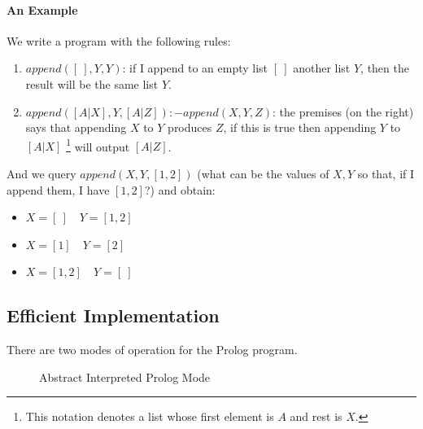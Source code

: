 \documentclass[10pt,a4paper]{article}
\begin{document}
\paragraph{An Example}
We write a program with the following rules:
\begin{enumerate}
\item $append([\ ],Y,Y)$: if I append to an empty list $[\ ]$ another list $Y$, then the result will be the same list $Y$.
\item $append([A|X],Y,[A|Z]) :- append(X,Y,Z)$: the premises (on the right) says that appending $X$ to $Y$ produces $Z$, if this is true then appending $Y$ to $[A|X]$ \footnote{This notation denotes a list whose first element is $A$ and rest is $X$.} will output $[A|Z]$. 
\end{enumerate}
And we query $append(X,Y,[1,2])$ (what can be the values of $X,Y$ so that, if I append them, I have $[1,2]$?) and obtain:
\begin{itemize}
\item $X=[\ ]\quad Y=[1,2]$
\item $X=[1]\quad Y=[2]$
\item $X=[1,2]\quad Y=[\ ]$
\end{itemize}


\subsection{Efficient Implementation}
There are two modes of operation for the Prolog program. 


\begin{figure}[H]
\centering
{}
\caption{Abstract Interpreted Prolog Mode}
\label{fig:interpreted_prolog}
\end{figure}
\end{document}

